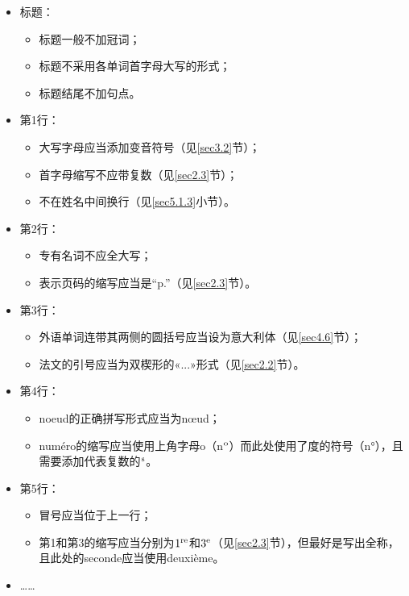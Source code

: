 \begin{itemize}
    \item 标题：
    \begin{itemize}
        \item 标题一般不加冠词；
        \item 标题不采用各单词首字母大写的形式；
        \item 标题结尾不加句点。
    \end{itemize} 
    \item 第1行：
    \begin{itemize}
        \item 大写字母应当添加变音符号（见\ref{sec3.2}节）；
        \item 首字母缩写不应带复数（见\ref{sec2.3}节）；
        \item 不在姓名中间换行（见\ref{sec5.1.3}小节）。
    \end{itemize}
    \item 第2行：
    \begin{itemize}
        \item 专有名词不应全大写；
        \item 表示页码的缩写应当是“p.”（见\ref{sec2.3}节）。
    \end{itemize}
    \item 第3行：
    \begin{itemize}
        \item 外语单词连带其两侧的圆括号应当设为意大利体（见\ref{sec4.6}节）；
        \item 法文的引号应当为双楔形的«...»形式（见\ref{sec2.2}节）。
    \end{itemize}
    \item 第4行：
    \begin{itemize}
        \item noeud的正确拼写形式应当为nœud；
        \item numéro的缩写应当使用上角字母o（n$^{\rm o}$）而此处使用了度的符号（n°），且需要添加代表复数的$^{\rm s}$。
    \end{itemize}
    \item 第5行：
    \begin{itemize}
        \item 冒号应当位于上一行；
        \item 第1和第3的缩写应当分别为$1^{\rm re}$和$3^{\rm e}$（见\ref{sec2.3}节），但最好是写出全称，且此处的seconde应当使用deuxième。
    \end{itemize}
    \item ……
\end{itemize}

